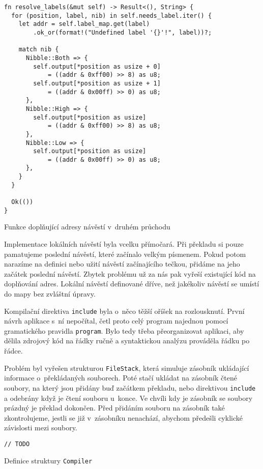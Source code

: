 \begin{listing}
\begin{verbatim}
fn resolve_labels(&mut self) -> Result<(), String> {
  for (position, label, nib) in self.needs_label.iter() {
    let addr = self.label_map.get(label)
        .ok_or(format!("Undefined label '{}'!", label))?;

    match nib {
      Nibble::Both => {
        self.output[*position as usize + 0]
            = ((addr & 0xff00) >> 8) as u8;
        self.output[*position as usize + 1]
            = ((addr & 0x00ff) >> 0) as u8;
      },
      Nibble::High => {
        self.output[*position as usize]
            = ((addr & 0xff00) >> 8) as u8;
      },
      Nibble::Low => {
        self.output[*position as usize]
            = ((addr & 0x00ff) >> 0) as u8;
      },
    }
  }

  Ok(())
}
\end{verbatim}
\caption{Funkce doplňující adresy návěstí v~druhém průchodu}
\label{fig:rust-result}
\end{listing}

Implementace lokálních návěstí byla vcelku přímočará. Při překladu si pouze pamatujeme poslední návěstí, které začínalo velkým písmenem. Pokud potom narazíme na definici nebo užití návěstí začínajícího tečkou, přidáme na jeho začátek poslední  návěstí. Zbytek problému už za nás pak vyřeší existující kód na doplňování adres. Lokální návěstí definované dříve, než jakékoliv  návěstí se umístí do mapy bez zvláštní úpravy.

Kompilační direktiva \texttt{include} byla o~něco těžší oříšek na rozlousknutí. První návrh aplikace s~ní nepočítal, četl proto celý program najednou pomocí gramatického pravidla \texttt{program}. Bylo tedy třeba přeorganizovat aplikaci, aby dělila zdrojový kód na řádky ručně a syntaktickou analýzu prováděla řádku po řádce.

Problém byl vyřešen strukturou \texttt{FileStack}, která simuluje zásobník ukládající informace o~překládaných souborech. Poté stačí ukládat na zásobník čtené soubory, na který jsou přidány buď začátkem překladu, nebo direktivou \texttt{include} a odebrány když je čtení souboru u~konce. Ve chvíli kdy je zásobník se soubory prázdný je překlad dokončen. Před přidáním souboru na zásobník také zkontrolujeme, jestli se již v~zásobníku nenachází, abychom předešli cyklické závislosti mezi soubory.


\begin{listing}
\begin{verbatim}
// TODO
\end{verbatim}
\caption{Definice struktury \texttt{Compiler}}
\label{fig:rust-file-stack}
\end{listing}

